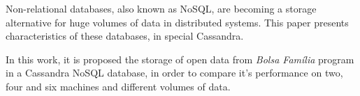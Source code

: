 Non-relational databases, also known as NoSQL, are becoming a storage alternative for huge volumes of data in distributed systems. This paper presents characteristics of these databases, in special Cassandra.

In this work, it is proposed the storage of open data from \emph{Bolsa Família} program in a Cassandra NoSQL database, in order to compare it's performance on two, four and six machines and different volumes of data.